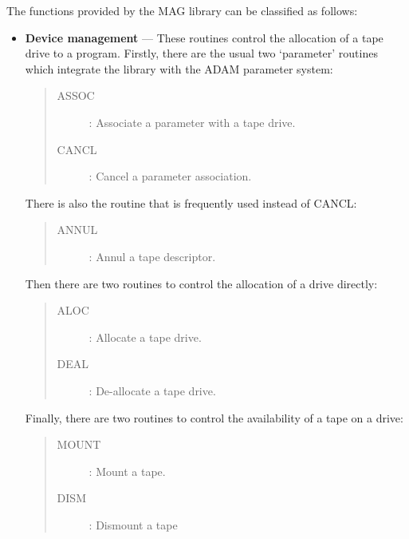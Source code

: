 The functions provided by the MAG library can be classified as follows:
\begin{itemize}
\item {\bf Device management} --- These routines control the allocation of
 a tape drive to a program.
 Firstly, there are the usual two `parameter' routines which integrate the
 library with the ADAM parameter system:
\begin{quote}
\begin{description}
\item [ASSOC] : Associate a parameter with a tape drive.
\item [CANCL] : Cancel a parameter association.
\end{description}
\end{quote}
 There is also the routine that is frequently used instead of CANCL:
\begin{quote}
\begin{description}
\item [ANNUL] : Annul a tape descriptor.
\end{description}
\end{quote}
 Then there are two routines to control the allocation of a drive directly:
\begin{quote}
\begin{description}
\item [ALOC] : Allocate a tape drive.
\item [DEAL] : De-allocate a tape drive.
\end{description}
\end{quote}
 Finally, there are two routines to control the availability of a tape on a
 drive:
\begin{quote}
\begin{description}
\item [MOUNT] : Mount a tape.
\item [DISM]  : Dismount a tape
\end{description}
\end{quote}


\end{itemize}

